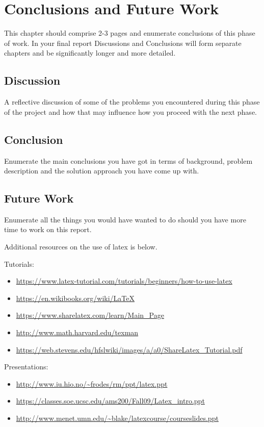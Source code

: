 \chapter{Conclusions and Future Work}
\label{chap:conclusions}
This chapter should comprise 2-3 pages and enumerate conclusions of this phase of work. In your final report Discussions and Conclusions will form separate chapters and be significantly longer and more detailed.

\section{Discussion}
A reflective discussion of some of the problems you encountered during this phase of the project and how that may influence how you proceed with the next phase.

\section{Conclusion}
Enumerate the main conclusions you have got in terms of background, problem description and the solution approach you have come up with.

\section{Future Work}
Enumerate all the things you would have wanted to do should you have more time to work on this report.

Additional resources on the use of latex is below.

Tutorials:
\begin{itemize}
    \item \url{https://www.latex-tutorial.com/tutorials/beginners/how-to-use-latex}
    \item \url{https://en.wikibooks.org/wiki/LaTeX}
    \item \url{https://www.sharelatex.com/learn/Main_Page}
    \item \url{http://www.math.harvard.edu/texman}
    \item \url{https://web.stevens.edu/hfslwiki/images/a/a0/ShareLatex_Tutorial.pdf}
\end{itemize}

Presentations:
\begin{itemize}
    \item \url{http://www.iu.hio.no/~frodes/rm/ppt/latex.ppt}
    \item \url{https://classes.soe.ucsc.edu/ams200/Fall09/Latex_intro.ppt}
    \item \url{http://www.menet.umn.edu/~blake/latexcourse/courseslides.ppt}
\end{itemize}

